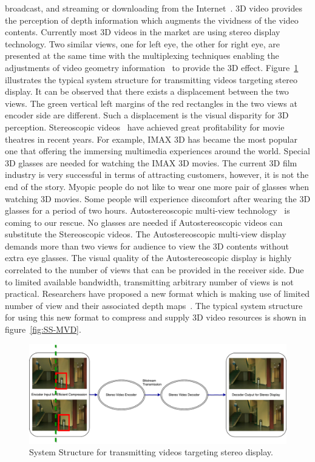 broadcast, and streaming or downloading from the Internet~\parencite{RN118}.
3D video provides the perception of depth information which augments
the vividness of the video contents.
Currently most 3D videos in the market are using stereo display technology.
Two similar views, one for left eye, the other for right eye, are presented
at the same time with the multiplexing techniques enabling the
adjustments of video geometry information~\parencite{RN196} to provide
the 3D effect.
Figure~\ref{fig:stereo-display} illustrates the typical system structure for
transmitting videos targeting stereo display.
It can be observed that there exists a displacement between the
two views.
The green vertical left margins of the red rectangles in the two views
at encoder side are different.
Such a displacement is the visual disparity for 3D perception.
Stereoscopic videos~\parencite{RN153} have
achieved great profitability for movie theatres in recent years.
For example, IMAX 3D has became the most popular one that offering
the immersing multimedia experiences around the world.
Special 3D glasses are needed for watching the IMAX 3D movies.
The current 3D film industry is very successful in terms of attracting
customers, however, it is not the end of the story.
Myopic people do not like to wear one more pair of glasses when
watching 3D movies.
Some people will experience discomfort after wearing the 3D glasses for a
period of two hours.
Autostereoscopic multi-view technology~\parencite{RN153} is coming to our rescue.
No glasses are needed if Autostereoscopic videos can
substitute the Stereoscopic videos.
The Autostereoscopic multi-view display demands more than two
views for audience to view the 3D contents
without extra eye glasses.
The visual quality of
the Autostereoscopic display is highly correlated to the number of views
that can be provided in the receiver side.
Due to limited available bandwidth, transmitting arbitrary number of views
is not practical.
Researchers have proposed a new format which is making use of limited number
of view and their associated depth maps~\parencite{RN44}.
The typical system structure for using this new format to compress and supply 3D video
resources is shown in figure~\ref{fig:SS-MVD}.
\begin{figure}
    \centering
    \includegraphics[width=\textwidth,height=\textheight,keepaspectratio]{Figures/StereoDisplay}
    \caption[System Structure for transmitting videos targeting stereo display]{System Structure for transmitting videos targeting stereo display.}
    \label{fig:stereo-display}
\end{figure}
